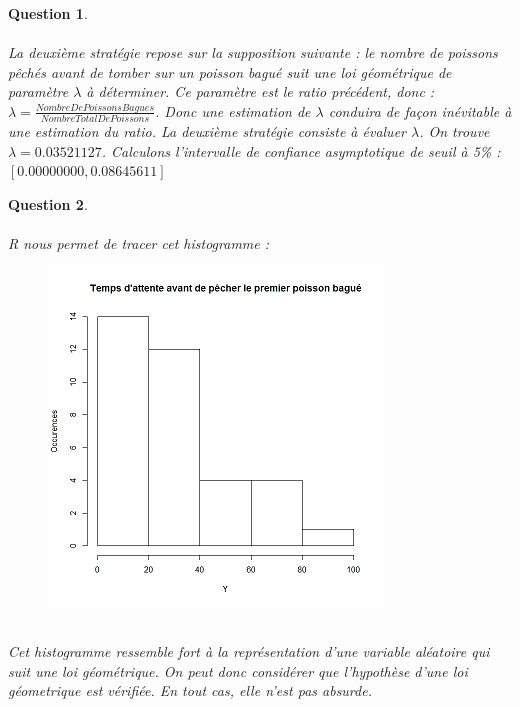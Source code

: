 \documentclass[a4paper,11pt]{article}
\newtheorem{exo3}{Question}
\begin{document}
\begin{exo3} \ \\ \\
La deuxième stratégie repose sur la supposition suivante : le nombre de poissons pêchés avant de tomber sur un poisson bagué suit une loi géométrique de paramètre $\lambda$ à déterminer. Ce paramètre est le ratio précédent, donc :\newline $\lambda=\frac{Nombre De Poissons Bagues}{Nombre Total De Poissons}$. \newline Donc une estimation de $\lambda$ conduira de façon inévitable à une estimation du ratio. La deuxième stratégie consiste à évaluer $\lambda$. \newline On trouve $\lambda=0.03521127$. Calculons l'intervalle de confiance asymptotique de seuil à 5\% : \newline $[0.00000000, 0.08645611]$
\end{exo3}

\begin{exo3} \ \\ \\
R nous permet de tracer cet histogramme :  \ \\
\begin{figure}[h]
\includegraphics[scale=1.2]{images/Histogramme_de_Y_avec_regroupement.jpeg}
\end{figure} \ \\
Cet histogramme ressemble fort à la représentation d'une variable aléatoire qui suit une loi géométrique. On peut donc considérer que l'hypothèse d'une loi géometrique est vérifiée. En tout cas, elle n'est pas absurde.
\end{exo3}
\end{document}
